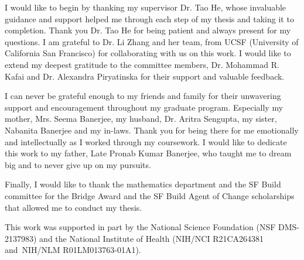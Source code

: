 \begin{acknowledgments}
I would like to begin by thanking my supervisor Dr. Tao He, whose invaluable guidance and support helped me through each step of my thesis and taking it to completion. Thank you Dr. Tao He for being patient and always present for my questions. I am grateful to Dr. Li Zhang and her team, from UCSF (University of California San Francisco) for collaborating with us on this work. I would like to extend my deepest gratitude to the committee members, Dr. Mohammad R. Kafai and Dr. Alexandra Piryatinska for their support and valuable feedback.\par

I can never be grateful enough to my friends and family for their unwavering support and encouragement throughout my graduate program. Especially my mother, Mrs. Seema Banerjee, my husband, Dr. Aritra Sengupta, my sister, Nabanita Banerjee and my in-laws. Thank you for being there for me emotionally and intellectually as I worked through my coursework. I would like to dedicate this work to my father, Late Pronab Kumar Banerjee, who taught me to dream big and to never give up on my pursuits.\par

Finally, I would like to thank the mathematics department and the SF Build committee for the Bridge Award and the SF Build Agent of Change scholarships that allowed me to conduct my thesis.\par

This work was supported in part by the National Science Foundation (NSF DMS-2137983) and the National Institute of Health (NIH/NCI R21CA264381 and NIH/NLM R01LM013763-01A1).
\end{acknowledgments}